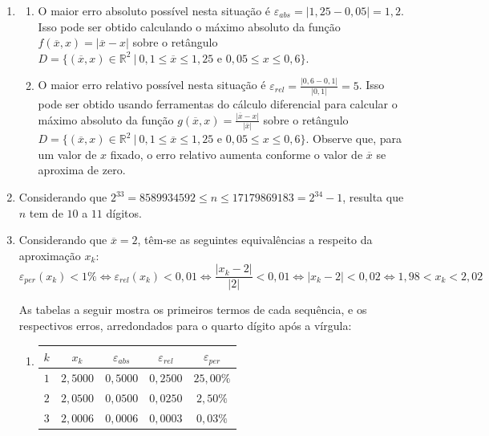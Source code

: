 \documentclass[12pt,a4paper]{article}
\newcommand*\R{\mathbb{R}}
\begin{document}
\begin{enumerate}
\item
\begin{enumerate}
\item O maior erro absoluto possível nesta situação é $\varepsilon_{abs} = |1,25 - 0,05| = 1,2$. Isso pode ser obtido calculando o máximo absoluto da função $f(\overline{x}, x) = |\overline{x} - x|$ sobre o retângulo $D = \{ (\overline{x}, x) \in \R^2 \ |\ 0,1 \leq \overline{x} \leq 1,25 \text{ e } 0,05 \leq x \leq 0,6 \}$.

\item O maior erro relativo possível nesta situação é $\varepsilon_{rel} = \frac{|0,6 - 0,1| }{ |0,1|} = 5$. Isso pode ser obtido usando ferramentas do cálculo diferencial para calcular o máximo absoluto da função $g(\overline{x}, x) = \frac{|\overline{x}-x| }{ |\overline{x}|}$ sobre o retângulo $D = \{ (\overline{x}, x) \in \R^2 \ |\ 0,1 \leq \overline{x} \leq 1,25 \text{ e } 0,05 \leq x \leq 0,6 \}$. Observe que, para um valor de $x$ fixado, o erro relativo aumenta conforme o valor de $\overline{x}$ se aproxima de zero.
\end{enumerate}

\item Considerando que $2^{33} = 8589934592 \leq n \leq 17179869183 = 2^{34}-1$, resulta que $n$ tem de $10$ a $11$ dígitos.
\item Considerando que $\overline{x} = 2$, têm-se as seguintes equivalências a respeito da aproximação $x_k$:
\[
\varepsilon_{per}(x_k) < 1\%
\Leftrightarrow
\varepsilon_{rel}(x_k) < 0,01
\Leftrightarrow
\frac{|x_k - 2|}{|2|} < 0,01
\Leftrightarrow
|x_k - 2| < 0,02
\Leftrightarrow
1,98 < x_k < 2,02
\]

As tabelas a seguir mostra os primeiros termos de cada sequência, e os respectivos erros, arredondados para o quarto dígito após a vírgula:
\begin{enumerate}
\item
\begin{tabular}{|c|c|c|c|c|}
\hline
$k$ & $x_k$ & $\varepsilon_{abs}$ & $\varepsilon_{rel}$ & $\varepsilon_{per}$ \\
\hline
$1$ & $2,5000$ & $0,5000$ & $0,2500$ & $25,00\%$ \\
\hline
$2$ & $2,0500$ & $0,0500$ & $0,0250$ & $2,50\%$ \\
\hline
$3$ & $2,0006$ & $0,0006$ & $0,0003$ & $0,03\%$ \\
\hline
\end{tabular}


\end{enumerate}
\end{enumerate}
\end{document}
